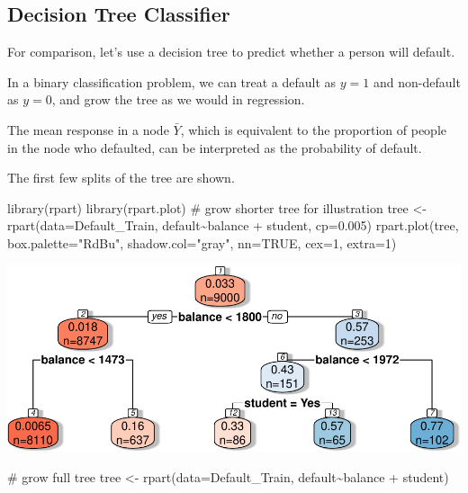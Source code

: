 \documentclass[
  letterpaper,
  DIV=11,
  numbers=noendperiod]{scrreprt}
\newenvironment{Shaded}{\begin{snugshade}}{\end{snugshade}}
\newcommand{\AttributeTok}[1]{\textcolor[rgb]{0.40,0.45,0.13}{#1}}
\newcommand{\CommentTok}[1]{\textcolor[rgb]{0.37,0.37,0.37}{#1}}
\newcommand{\ConstantTok}[1]{\textcolor[rgb]{0.56,0.35,0.01}{#1}}
\newcommand{\DecValTok}[1]{\textcolor[rgb]{0.68,0.00,0.00}{#1}}
\newcommand{\FloatTok}[1]{\textcolor[rgb]{0.68,0.00,0.00}{#1}}
\newcommand{\FunctionTok}[1]{\textcolor[rgb]{0.28,0.35,0.67}{#1}}
\newcommand{\NormalTok}[1]{\textcolor[rgb]{0.00,0.23,0.31}{#1}}
\newcommand{\OtherTok}[1]{\textcolor[rgb]{0.00,0.23,0.31}{#1}}
\newcommand{\SpecialCharTok}[1]{\textcolor[rgb]{0.37,0.37,0.37}{#1}}
\newcommand{\StringTok}[1]{\textcolor[rgb]{0.13,0.47,0.30}{#1}}
\begin{document}
\subsection{Decision Tree Classifier}\label{decision-tree-classifier}

For comparison, let's use a decision tree to predict whether a person
will default.

In a binary classification problem, we can treat a default as \(y=1\)
and non-default as \(y=0\), and grow the tree as we would in regression.

The mean response in a node \(\bar{Y}\), which is equivalent to the
proportion of people in the node who defaulted, can be interpreted as
the probability of default.

The first few splits of the tree are shown.

\begin{Shaded}
\begin{Highlighting}[]
\FunctionTok{library}\NormalTok{(rpart)}
\FunctionTok{library}\NormalTok{(rpart.plot)}
\CommentTok{\# grow shorter tree for illustration}
\NormalTok{tree }\OtherTok{\textless{}{-}} \FunctionTok{rpart}\NormalTok{(}\AttributeTok{data=}\NormalTok{Default\_Train, default}\SpecialCharTok{\textasciitilde{}}\NormalTok{balance }\SpecialCharTok{+}\NormalTok{ student, }\AttributeTok{cp=}\FloatTok{0.005}\NormalTok{)}
\FunctionTok{rpart.plot}\NormalTok{(tree, }\AttributeTok{box.palette=}\StringTok{"RdBu"}\NormalTok{, }\AttributeTok{shadow.col=}\StringTok{"gray"}\NormalTok{, }\AttributeTok{nn=}\ConstantTok{TRUE}\NormalTok{, }\AttributeTok{cex=}\DecValTok{1}\NormalTok{, }\AttributeTok{extra=}\DecValTok{1}\NormalTok{)}
\end{Highlighting}
\end{Shaded}

\includegraphics{Ch7_files/figure-pdf/unnamed-chunk-99-1.pdf}

\begin{Shaded}
\begin{Highlighting}[]
\CommentTok{\# grow full tree}
\NormalTok{tree }\OtherTok{\textless{}{-}} \FunctionTok{rpart}\NormalTok{(}\AttributeTok{data=}\NormalTok{Default\_Train, default}\SpecialCharTok{\textasciitilde{}}\NormalTok{balance }\SpecialCharTok{+}\NormalTok{ student)}
\end{Highlighting}
\end{Shaded}
\end{document}

